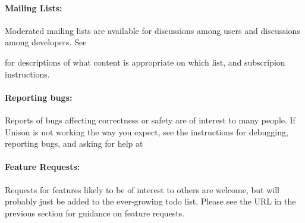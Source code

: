 \paragraph{Mailing Lists:}

Moderated mailing lists are available for discussions among users and
discussions among developers.
See
\begin{quote}
\end{quote}
for descriptions of what content is appropriate on which list, and
subscripion instructions.

\paragraph{Reporting bugs:}

Reports of bugs affecting correctness or safety are of interest to
many people.
If Unison is not working the way you expect, see the instructions for
debugging, reporting bugs, and asking for help at
\begin{quote}
\end{quote}

\paragraph{Feature Requests:}

Requests for features likely to be of interest to others are welcome,
but will probably just be added to the ever-growing todo list.
Please see the URL in the previous section for guidance on feature
requests.
